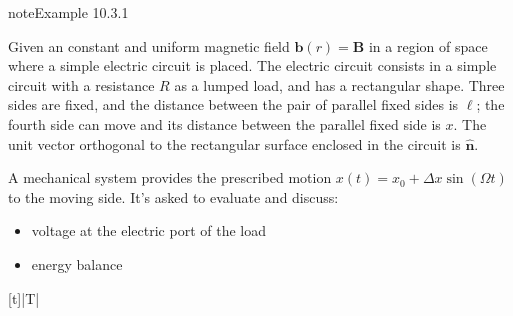 \documentclass[letterpaper,10pt,english]{jupyterBook}
\begin{document}
\begin{sphinxadmonition}{note}{Example 10.3.1}



\sphinxAtStartPar
Given an constant and uniform magnetic field \(\mathbf{b}(r) = \mathbf{B}\) in a region of space where a simple electric circuit is placed. The electric circuit consists in a simple circuit with a resistance \(R\) as a lumped load, and has a rectangular shape. Three sides are fixed, and the distance between the pair of parallel fixed sides is \(\ell\); the fourth side can move and its distance between the parallel fixed side is \(x\). The unit vector orthogonal to the rectangular surface enclosed in the circuit is \(\hat{\mathbf{n}}\).

\sphinxAtStartPar
A mechanical system provides the prescribed motion \(x(t) = x_0 + \Delta x \sin(\Omega t)\) to the moving side. It’s asked to evaluate and discuss:
\begin{itemize}
\item {} 
\sphinxAtStartPar
voltage at the electric port of the load

\item {} 
\sphinxAtStartPar
energy balance

\end{itemize}


\begin{savenotes}\sphinxattablestart
\centering
\begin{tabulary}{\linewidth}[t]{|T|}
\hline

\sphinxAtStartPar
{}
\\
\hline
\end{tabulary}
\par
\sphinxattableend\end{savenotes}


\end{sphinxadmonition}
\end{document}
